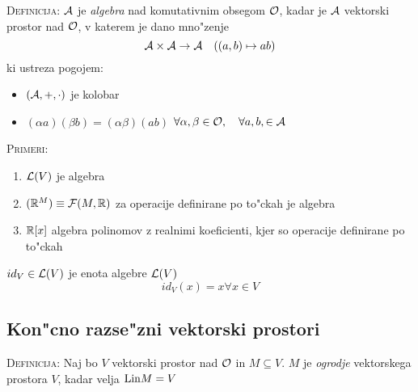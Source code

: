 \textsc{Definicija:} $\mathcal{A}$ je \emph{algebra} nad komutativnim obsegom $\mathcal{O}$, kadar je $\mathcal{A}$ vektorski prostor nad $\mathcal{O}$, v katerem je dano mno"zenje
\begin{equation*}
\mathcal{A} \times \mathcal{A} \to \mathcal{A} \quad ((a, b) \mapsto ab)
\end{equation*}
ki ustreza pogojem:
\begin{itemize}
	\item $(\mathcal{A}, +, \cdot)$ je kolobar
	\item $(\alpha a) (\beta b) = (\alpha \beta) (ab)$ \hfill $\forall \alpha, \beta \in \mathcal{O}, \quad \forall a, b, \in \mathcal{A}$
\end{itemize}
\textsc{Primeri:}
\begin{enumerate}[(1)]
	\item $\mathcal{L}(V)$ je algebra
	\item $(\mathbb{R}^M) \equiv \mathcal{F}(M, \mathbb{R})$ za operacije definirane po to"ckah je algebra
	\item $\mathbb{R}[x]$ algebra polinomov z realnimi koeficienti, kjer so operacije definirane po to"ckah
\end{enumerate}
$id_V \in \mathcal{L}(V)$ je enota algebre $\mathcal{L}(V)$
\begin{equation*}
id_V (x) = x \forall x \in V
\end{equation*}
%
\subsection{Kon"cno razse"zni vektorski prostori}
\textsc{Definicija:} Naj bo $V$ vektorski prostor nad $\mathcal{O}$ in $M \subseteq V$. $M$ je \emph{ogrodje} vektorskega prostora $V$, kadar velja $\text{Lin} M = V$

